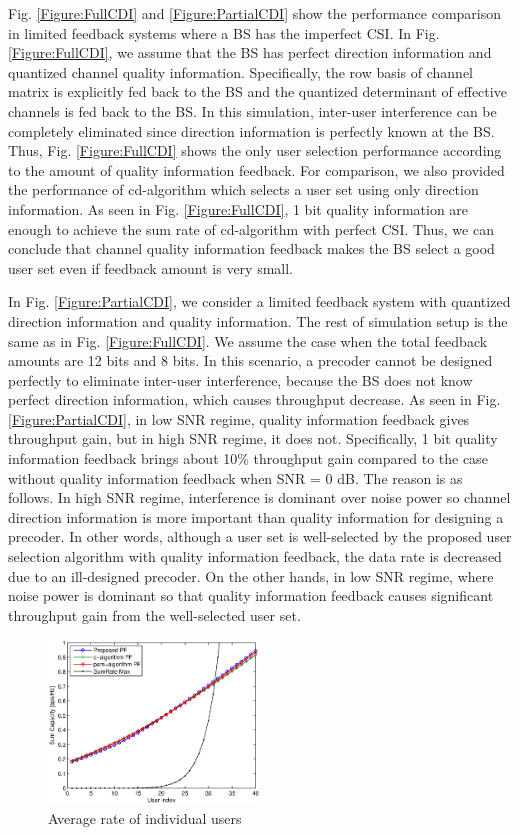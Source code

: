 \documentclass[journal,twoside]{IEEEtranTCOM}
\begin{document}
Fig. \ref{Figure:FullCDI} and \ref{Figure:PartialCDI} show the performance comparison in limited feedback systems where a BS has the imperfect CSI. In Fig. \ref{Figure:FullCDI}, we assume that the BS has perfect direction information and quantized channel quality information. Specifically, the row basis of channel matrix is explicitly fed back to the BS and the quantized determinant of effective channels is fed back to the BS. In this simulation, inter-user interference can be completely eliminated since direction information is perfectly known at the BS. Thus, Fig. \ref{Figure:FullCDI} shows the only user selection performance according to the amount of quality information feedback. For comparison, we also provided the performance of cd-algorithm which selects a user set using only direction information. As seen in Fig. \ref{Figure:FullCDI}, 1 bit quality information are enough to achieve the sum rate of cd-algorithm with perfect CSI. Thus, we can conclude that channel quality information feedback makes the BS select a good user set even if feedback amount is very small.

In Fig. \ref{Figure:PartialCDI}, we consider a limited feedback system with quantized direction information and quality information. The rest of simulation setup is the same as in Fig. \ref{Figure:FullCDI}. We assume the case when the total feedback amounts are 12 bits and 8 bits. In this scenario, a precoder cannot be designed perfectly to eliminate inter-user interference, because the BS does not know perfect direction information, which causes throughput decrease. As seen in Fig. \ref{Figure:PartialCDI}, in low SNR regime, quality information feedback gives throughput gain, but in high SNR regime, it does not. Specifically, 1 bit quality information feedback brings about 10\% throughput gain compared to the case without quality information feedback when SNR = 0 dB. The reason is as follows. In high SNR regime, interference is dominant over noise power so channel direction information is more important than quality information for designing a precoder. In other words, although a user set is well-selected by the proposed user selection algorithm with quality information feedback, the data rate is decreased due to an ill-designed precoder. On the other hands, in low SNR regime, where noise power is dominant so that quality information feedback causes significant throughput gain from the well-selected user set.

\begin{figure}[!tb]
    \centering
    \includegraphics[width=0.50\textwidth]{PF2.eps}
\caption{Average rate of individual users}  \label{Figure:PF}
\end{figure}
\end{document}
